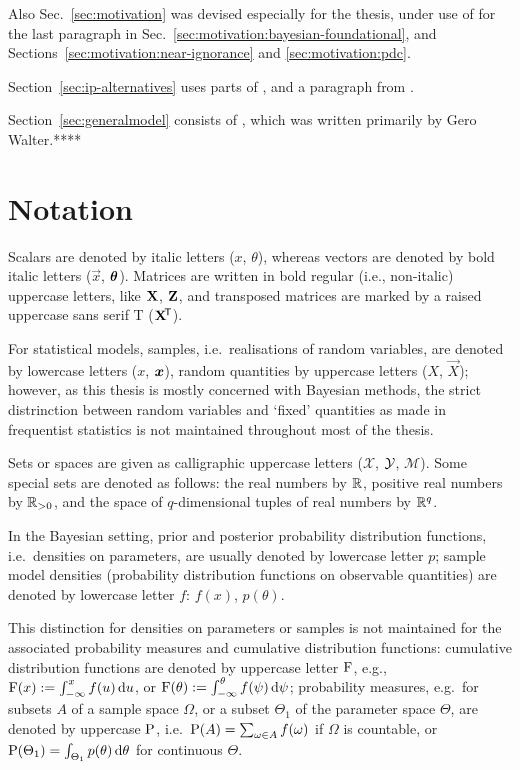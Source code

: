 Also Sec.~\ref{sec:motivation} was devised especially for the thesis,
under use of \textcite[\S 2.3]{itip-statinf} for the last paragraph in
Sec.~\ref{sec:motivation:bayesian-foundational},
and Sections~\ref{sec:motivation:near-ignorance} and \ref{sec:motivation:pdc}.

Section~\ref{sec:ip-alternatives} uses parts of \textcite[\S 2.2, 2.4]{itip-statinf},
and a paragraph from \textcite[\S 7]{itip-statinf}.

Section~\ref{sec:generalmodel} consists of \textcite[\S 4.3]{itip-statinf},
which was written primarily by Gero Walter.****

\section{Notation}
\label{sec:notation}

Scalars are denoted by italic letters ($x$, $\theta$),
whereas vectors are denoted by bold italic letters ($\vec{x}$, $\boldsymbol{\theta}$).
Matrices are written in bold regular (i.e., non-italic) uppercase letters, like $\mathbf{X}$, $\mathbf{Z}$,
and transposed matrices are marked by a raised uppercase sans serif T ($\mathbf{X}^{{\mbox{\!\scriptsize\textsf{T}}}}$).

For statistical models, samples, i.e.\ realisations of random variables,
are denoted by lowercase letters ($x$, ${\bm x}$),
random quantities by uppercase letters ($X$, $\vec{X}$);
however, as this thesis is mostly concerned with Bayesian methods,
the strict distrinction between random variables and `fixed' quantities as made in frequentist statistics
is not maintained throughout most of the thesis.

Sets or spaces are given as calligraphic uppercase letters ($\mathcal{X}$, $\mathcal{Y}$, $\mathcal{M}$).
Some special sets are denoted as follows:
the real numbers by $\mathbb{R}$, positive real numbers by $\mathbb{R}_{>0}$,
and the space of $q$-dimensional tuples of real numbers by $\mathbb{R}^q$.

In the Bayesian setting, prior and posterior probability distribution functions, i.e.\ densities on parameters,
are usually denoted by lowercase letter $p$;
sample model densities (probability distribution functions on observable quantities)
are denoted by lowercase letter $f$:
$f(x)$, $p(\theta)$.

This distinction for densities on parameters or samples
is not maintained for the associated probability measures and cumulative distribution functions:
cumulative distribution functions are denoted by uppercase letter $\operatorname{F}$,
e.g., $\operatorname{F}(x) := \int_{-\infty}^x f(u) \,\mathrm{d} u$, or $\operatorname{F}(\theta) := \int_{-\infty}^\theta f(\psi) \,\mathrm{d} \psi$;
probability measures, e.g.\ for subsets $A$ of a sample space $\Omega$,
or a subset $\Theta_1$ of the parameter space $\Theta$,
are denoted by uppercase $\operatorname{P}$,
i.e.\ $\operatorname{P}(A) = \sum_{\omega \in A} f(\omega)$ if $\Omega$ is countable,
or $\operatorname{P}(\Theta_1) = \int_{\Theta_1} p(\theta) \,\mathrm{d} \theta$ for continuous $\Theta$.


